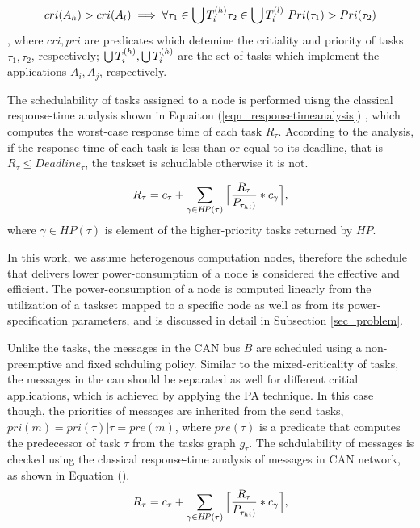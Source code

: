 \[cri(A_h)>cri(A_l)\implies \forall \tau_1\in\bigcup\sss{T}[h]\tau_2\in\bigcup\sss{T}[l]\ Pri(\tau_1)>Pri(\tau_2)\],
where $cri, pri$ are predicates which detemine the critiality and priority of tasks $\tau_1,\tau_2$, respectively; $\bigcup\sss{T}[h], \bigcup\sss{T}[h]$ are the set of tasks which implement the applications $A_i,A_j$, respectively.

The schedulability of tasks assigned to a node is performed uisng the classical response-time analysis shown in Equaiton (\ref{eqn_responsetimeanalysis}) \cite{Baruah2011Response-timeSystems,Baruah2011Response-timeSystems}, which computes the worst-case response time of each task $R_\tau$. According to the analysis, if the response time of each task is less than or equal to its deadline, that is $R_\tau\leq Deadline_\tau$, the taskset is schudlable otherwise it is not. 

\begin{align}
\label{eqn_responsetimeanalysis}
R_\tau=c_\tau+\sum_{\gamma \in H\!P(\tau)}{\ceil[\Big]{\frac{R_\tau}{P_{\tau_{hi})}}*c_\gamma}},
\end{align}
 where $\gamma\in H\!P(\tau)$ is element of the higher-priority tasks returned by $H\!P$.

In this work, we assume heterogenous computation nodes, therefore the schedule that delivers lower power-consumption of a node is considered the effective and efficient. The power-consumption of a node is computed linearly from the utilization of a taskset mapped to a specific node as well as from its power-specification parameters, and is discussed in detail in Subsection \ref{sec_problem}.

Unlike the tasks, the messages in the CAN bus $B$ are scheduled using a non-preemptive and fixed schduling policy. Similar to the mixed-criticality of tasks, the messages in the can should be separated as well for different critial applications, which is achieved by applying the PA technique. In this case though, the priorities of messages are inherited from the send tasks, $pri(m)=pri(\tau)|\tau = pre(m)$, where $pre(\tau)$ is a predicate that computes the predecessor of task $\tau$ from the tasks graph $g_\tau$. The schdulability of messages is checked using the classical response-time analysis of messages in CAN network, as shown in Equation ().
\begin{align}
\label{eqn_responsetimeanalysisCAN}
R_\tau=c_\tau+\sum_{\gamma \in H\!P(\tau)}{\ceil[\Big]{\frac{R_\tau}{P_{\tau_{hi})}}*c_\gamma}},
\end{align}


